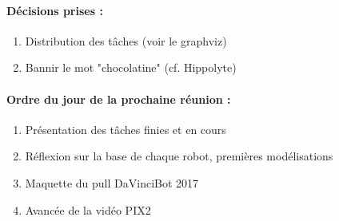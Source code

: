 \documentclass[12pt]{report}
\begin{document}
\paragraph{Décisions prises :}
\begin{enumerate}
 \item Distribution des tâches (voir le graphviz)
 \item Bannir le mot "chocolatine" (cf. Hippolyte)
\end{enumerate}


\paragraph{Ordre du jour de la prochaine réunion :}
\begin{enumerate}
 \item Présentation des tâches finies et en cours
 \item Réflexion sur la base de chaque robot, premières modélisations
 \item Maquette du pull DaVinciBot 2017
 \item Avancée de la vidéo PIX2
\end{enumerate}
\end{document}

